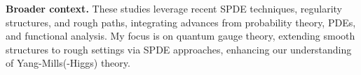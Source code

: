 \documentclass[./Research_statement.tex]{subfiles}
\begin{document}
\vspace{2pt}

\noindent \textbf{Broader context.}  
These studies leverage recent SPDE techniques, regularity structures, and rough paths, integrating advances from probability theory, PDEs, and functional analysis. My focus is on quantum gauge theory, extending smooth structures to rough settings via SPDE approaches, enhancing our understanding of Yang-Mills(-Higgs) theory.
\end{document}
